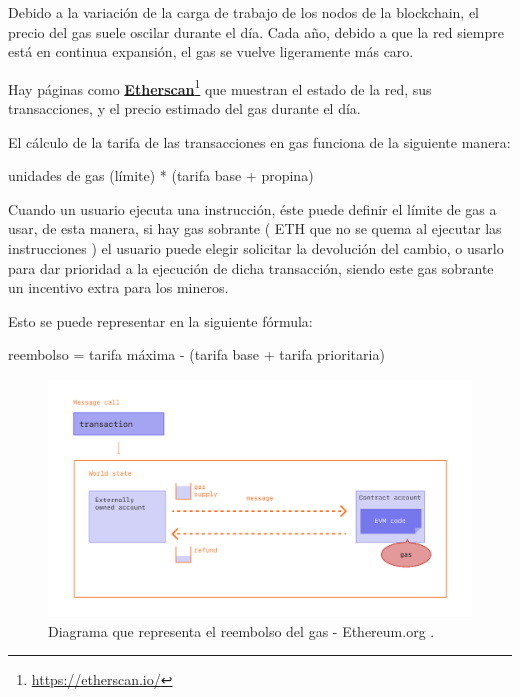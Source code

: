 \bigskip

Debido a la variación de la carga de trabajo de los nodos de la blockchain, el precio del gas suele oscilar durante el día. Cada año, debido a que la red siempre está en continua expansión, el gas se vuelve ligeramente más caro.

\bigskip

Hay páginas como \textcolor{blue}{\href{https://etherscan.io}{\textbf{Etherscan}}}\footnote{\url{https://etherscan.io/}} que muestran el estado de la red, sus transacciones, y el precio estimado del gas durante el día.

\bigskip

El cálculo de la tarifa de las transacciones en gas funciona de la siguiente manera: 

\bigskip

\centerline{unidades de gas (límite) * (tarifa base + propina)}

\bigskip

Cuando un usuario ejecuta una instrucción, éste puede definir el límite de gas a usar, de esta manera, si hay gas sobrante ( ETH que no se quema al ejecutar las instrucciones ) el usuario puede elegir solicitar la devolución del cambio, o usarlo para dar prioridad a la ejecución de dicha transacción, siendo este gas sobrante un incentivo extra para los mineros.

\newpage

Esto se puede representar en la siguiente fórmula:

\centerline{reembolso = tarifa máxima - (tarifa base + tarifa prioritaria)}

\begin{figure}[H]
    \centering
    \includegraphics[width=1\textwidth]{img/capturas/gas.png}
    \caption{Diagrama que representa el reembolso del gas - Ethereum.org .}
    \label{fig:configApi}
\end{figure}


